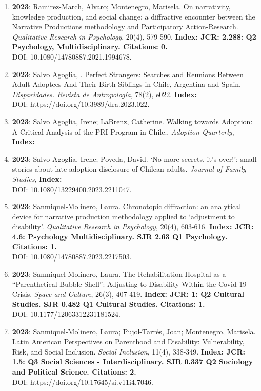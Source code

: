 \begin{enumerate}
\item {\bf 2023}: Ramirez-March, Alvaro; Montenegro, Marisela.  On narrativity, knowledge production, and social change: a diffractive encounter between the Narrative Productions methodology and Participatory Action-Research. {\it Qualitative Research in Psychology}, 20(4), 579-590. {\bf Index: JCR: 2.288: Q2 Psychology, Multidisciplinary.  Citations: 0. } \\ DOI: 10.1080/14780887.2021.1994678. \filbreak
\item {\bf 2023}: Salvo Agoglia, .  Perfect Strangers: Searches and Reunions Between Adult Adoptees And Their Birth Siblings in Chile, Argentina and Spain. {\it Disparidades. Revista de Antropología}, 78(2), e022. {\bf Index: } \\ DOI: https://doi.org/10.3989/dra.2023.022. \filbreak
\item {\bf 2023}: Salvo Agoglia, Irene; LaBrenz, Catherine.  Walking towards Adoption: A Critical Analysis of the PRI Program in Chile.. {\it Adoption Quarterly}, {\bf Index: } \filbreak
\item {\bf 2023}: Salvo Agoglia, Irene; Poveda, David.  ‘No more secrets, it’s over!’: small stories about late adoption disclosure of Chilean adults. {\it Journal of Family Studies}, {\bf Index: } \\ DOI: 10.1080/13229400.2023.2211047. \filbreak
\item {\bf 2023}: Sanmiquel-Molinero, Laura.  Chronotopic diffraction: an analytical device for narrative production methodology applied to ‘adjustment to disability’. {\it Qualitative Research in Psychology}, 20(4), 603-616. {\bf Index: JCR: 4.6: Psychology Multidisciplinary.  SJR 2.63 Q1 Psychology. Citations: 1. } \\ DOI: 10.1080/14780887.2023.2217503. \filbreak
\item {\bf 2023}: Sanmiquel-Molinero, Laura.  The Rehabilitation Hospital as a “Parenthetical Bubble-Shell”: Adjusting to Disability Within the Covid-19 Crisis. {\it Space and Culture}, 26(3), 407-419. {\bf Index: JCR: 1: Q2 Cultural Studies.  SJR 0.482 Q1 Cultural Studies. Citations: 1. } \\ DOI: 10.1177/12063312231181524. \filbreak
\item {\bf 2023}: Sanmiquel-Molinero, Laura; Pujol-Tarrés, Joan; Montenegro, Marisela.  Latin American Perspectives on Parenthood and Disability: Vulnerability, Risk, and Social Inclusion. {\it Social Inclusion}, 11(4), 338-349. {\bf Index: JCR: 1.5: Q3 Social Sciences - Interdisciplinary.  SJR 0.337 Q2 Sociology and Political Science. Citations: 2. } \\ DOI: https://doi.org/10.17645/si.v11i4.7046. \filbreak

\end{enumerate}
